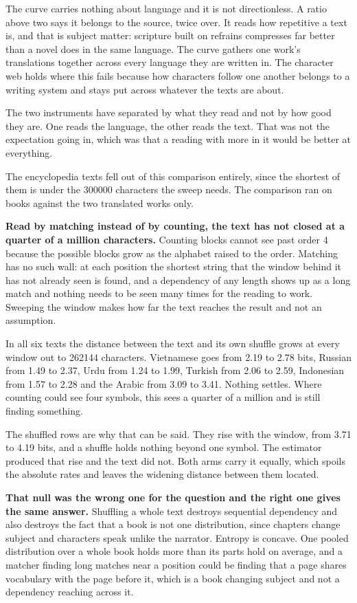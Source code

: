 The curve carries nothing about language and it is not directionless. A ratio above two says it belongs to the source, twice over. It reads how repetitive a text is, and that is subject matter: scripture built on refrains compresses far better than a novel does in the same language. The curve gathers one work's translations together across every language they are written in. The character web holds where this fails because how characters follow one another belongs to a writing system and stays put across whatever the texts are about.

The two instruments have separated by what they read and not by how good they are. One reads the language, the other reads the text. That was not the expectation going in, which was that a reading with more in it would be better at everything.

The encyclopedia texts fell out of this comparison entirely, since the shortest of them is under the 300000 characters the sweep needs. The comparison ran on books against the two translated works only.

\textbf{Read by matching instead of by counting, the text has not closed at a quarter of a million characters.} Counting blocks cannot see past order 4 because the possible blocks grow as the alphabet raised to the order. Matching has no such wall: at each position the shortest string that the window behind it has not already seen is found, and a dependency of any length shows up as a long match and nothing needs to be seen many times for the reading to work. Sweeping the window makes how far the text reaches the result and not an assumption.

In all six texts the distance between the text and its own shuffle grows at every window out to 262144 characters. Vietnamese goes from 2.19 to 2.78 bits, Russian from 1.49 to 2.37, Urdu from 1.24 to 1.99, Turkish from 2.06 to 2.59, Indonesian from 1.57 to 2.28 and the Arabic from 3.09 to 3.41. Nothing settles. Where counting could see four symbols, this sees a quarter of a million and is still finding something.

The shuffled rows are why that can be said. They rise with the window, from 3.71 to 4.19 bits, and a shuffle holds nothing beyond one symbol. The estimator produced that rise and the text did not. Both arms carry it equally, which spoils the absolute rates and leaves the widening distance between them located.

\textbf{That null was the wrong one for the question and the right one gives the same answer.} Shuffling a whole text destroys sequential dependency and also destroys the fact that a book is not one distribution, since chapters change subject and characters speak unlike the narrator. Entropy is concave. One pooled distribution over a whole book holds more than its parts hold on average, and a matcher finding long matches near a position could be finding that a page shares vocabulary with the page before it, which is a book changing subject and not a dependency reaching across it.

